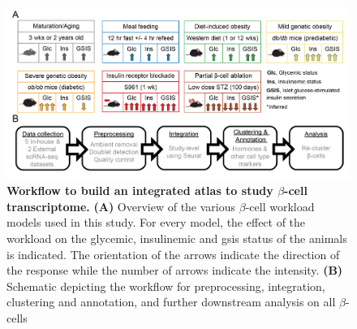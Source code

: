 \begin{figure}[b!]
\centering
\includegraphics[width=\linewidth]{Chapter5/Fig/F3-1-v2-02.png}
\caption[Workflow to build an integrated atlas to study $\beta$-cell transcriptome]{\textbf{Workflow to build an integrated atlas to study $\beta$-cell transcriptome.} \textbf{(A)} Overview of the various $\beta$-cell workload models used in this study. For every model, the effect of the workload on the glycemic, insulinemic and \gls{gsis} status of the animals is indicated. The orientation of the arrows indicate the direction of the response while the number of arrows indicate the intensity. \textbf{(B)} Schematic depicting the workflow for preprocessing, integration, clustering and annotation, and further downstream analysis on all $\beta$-cells}
\label{fig:chp3_workflow}
\end{figure}


